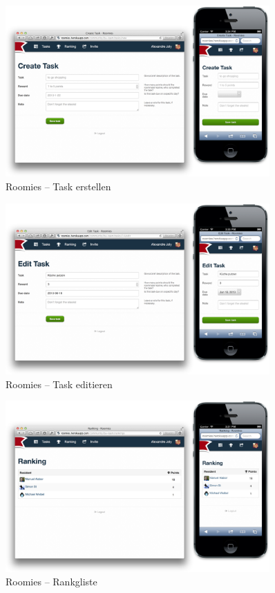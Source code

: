 \begin{figure}[H]
	\centering
	\includegraphics[width=0.9\textwidth]{content/appendix/roomies-screenshots/create_task.png}
	\caption{Roomies -- Task erstellen}
	\label{fig:roomies-ss-create-task}
\end{figure}

\begin{figure}[H]
	\centering
	\includegraphics[width=0.9\textwidth]{content/appendix/roomies-screenshots/edit_task.png}
	\caption{Roomies -- Task editieren}
	\label{fig:roomies-ss-edit-task}
\end{figure}

\begin{figure}[H]
	\centering
	\includegraphics[width=0.9\textwidth]{content/appendix/roomies-screenshots/ranking.png}
	\caption{Roomies -- Rankgliste}
	\label{fig:roomies-ss-ranking}
\end{figure}

